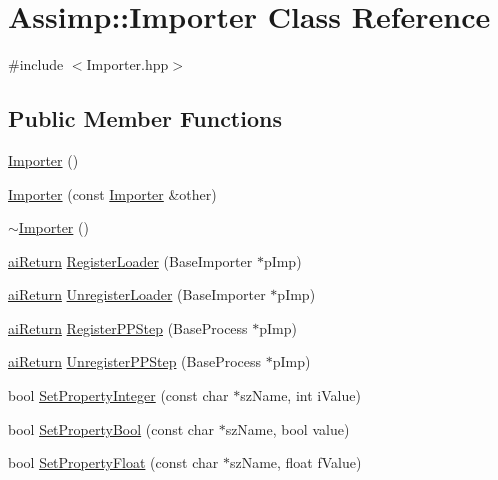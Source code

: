 \hypertarget{class_assimp_1_1_importer}{\section{Assimp\-:\-:Importer Class Reference}
\label{class_assimp_1_1_importer}
}


{\ttfamily \#include $<$Importer.\-hpp$>$}

\subsection*{Public Member Functions}
\begin{DoxyCompactItemize}
\item 
\hyperlink{class_assimp_1_1_importer_a2c207299ed05f1db1ad1e6dab005f719}{Importer} ()
\item 
\hyperlink{class_assimp_1_1_importer_a69743664b5a7a8c195be48265144317b}{Importer} (const \hyperlink{class_assimp_1_1_importer}{Importer} \&other)
\item 
\hyperlink{class_assimp_1_1_importer_a3d65af5286ba22f46220a72a6eb2a1c9}{$\sim$\-Importer} ()
\item 
\hyperlink{types_8h_a1f78dfb65090aa930cabb984c8abe711}{ai\-Return} \hyperlink{class_assimp_1_1_importer_a3846294ffe76d91a1d3096d22d7c6b7d}{Register\-Loader} (Base\-Importer $\ast$p\-Imp)
\item 
\hyperlink{types_8h_a1f78dfb65090aa930cabb984c8abe711}{ai\-Return} \hyperlink{class_assimp_1_1_importer_a3b1f5af2c763b13aca0f324b19001722}{Unregister\-Loader} (Base\-Importer $\ast$p\-Imp)
\item 
\hyperlink{types_8h_a1f78dfb65090aa930cabb984c8abe711}{ai\-Return} \hyperlink{class_assimp_1_1_importer_a102650d3648c0e414a1e73bdad9bed35}{Register\-P\-P\-Step} (Base\-Process $\ast$p\-Imp)
\item 
\hyperlink{types_8h_a1f78dfb65090aa930cabb984c8abe711}{ai\-Return} \hyperlink{class_assimp_1_1_importer_a3a683671c7c40638b1103c5d3648d86c}{Unregister\-P\-P\-Step} (Base\-Process $\ast$p\-Imp)
\item 
bool \hyperlink{class_assimp_1_1_importer_a2542eed3d5f491025c4095b4e55fa068}{Set\-Property\-Integer} (const char $\ast$sz\-Name, int i\-Value)
\item 
bool \hyperlink{class_assimp_1_1_importer_a4af22a88eddf464d949a761149c72825}{Set\-Property\-Bool} (const char $\ast$sz\-Name, bool value)
\item 
bool \hyperlink{class_assimp_1_1_importer_ab1854be9aa766a748804a69c69fe4901}{Set\-Property\-Float} (const char $\ast$sz\-Name, float f\-Value)

\end{DoxyCompactItemize}
